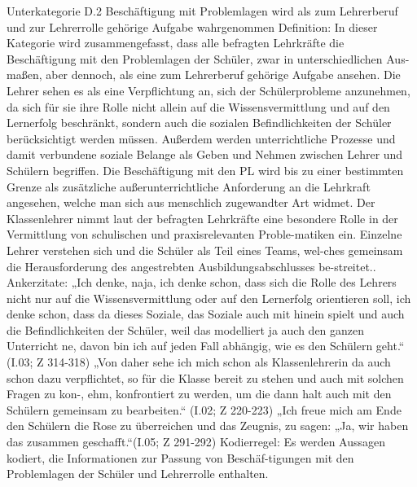 Unterkategorie D.2 Beschäftigung mit Problemlagen wird als zum Lehrerberuf und zur Lehrerrolle gehörige Aufgabe wahrgenommen
Definition: In dieser Kategorie wird zusammengefasst, dass alle befragten Lehrkräfte die Beschäftigung mit den Problemlagen der Schüler, zwar in unterschiedlichen Aus-maßen, aber dennoch, als eine zum Lehrerberuf gehörige Aufgabe ansehen. Die Lehrer sehen es als eine Verpflichtung an, sich der Schülerprobleme anzunehmen, da sich für sie ihre Rolle nicht allein auf die Wissensvermittlung und auf den Lernerfolg beschränkt, sondern auch die sozialen Befindlichkeiten der Schüler berücksichtigt werden müssen. Außerdem werden unterrichtliche Prozesse und damit verbundene soziale Belange als Geben und Nehmen zwischen Lehrer und Schülern begriffen. Die Beschäftigung mit den PL wird bis zu einer bestimmten Grenze als zusätzliche außerunterrichtliche Anforderung an die Lehrkraft angesehen, welche man sich aus menschlich zugewandter Art widmet. Der Klassenlehrer nimmt laut der befragten Lehrkräfte eine besondere Rolle in der Vermittlung von schulischen und praxisrelevanten Proble-matiken ein. Einzelne Lehrer verstehen sich und die Schüler als Teil eines Teams, wel-ches gemeinsam die Herausforderung des angestrebten Ausbildungsabschlusses be-streitet..
Ankerzitate:
„Ich denke, naja, ich denke schon, dass sich die Rolle des Lehrers nicht nur auf die Wissensvermittlung oder auf den Lernerfolg orientieren soll, ich denke schon, dass da dieses Soziale, das Soziale auch mit hinein spielt und auch die Befindlichkeiten der Schüler, weil das modelliert ja auch den ganzen Unterricht ne, davon bin ich auf jeden Fall abhängig, wie es den Schülern geht.“ (I.03; Z 314-318) 
„Von daher sehe ich mich schon als Klassenlehrerin da auch schon dazu verpflichtet, so für die Klasse bereit zu stehen und auch mit solchen Fragen zu kon-, ehm, konfrontiert zu werden, um die dann halt auch mit den Schülern gemeinsam zu bearbeiten.“ (I.02; Z 220-223)
„Ich freue mich am Ende den Schülern die Rose zu überreichen und das Zeugnis, zu sagen: „Ja, wir haben das zusammen geschafft.“(I.05; Z 291-292)
Kodierregel: Es werden Aussagen kodiert, die Informationen zur Passung von Beschäf-tigungen mit den Problemlagen der Schüler und Lehrerrolle enthalten. 

